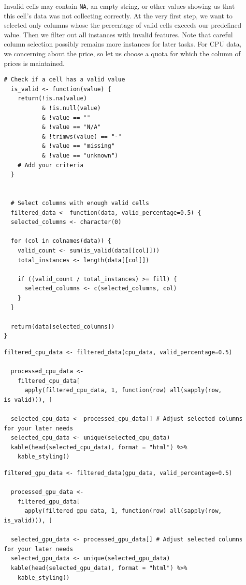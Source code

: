 Invalid cells may contain \texttt{NA}, an empty string, or other values showing us that this cell's data was not collecting correctly. At the very first step, we want to selected only columns whose the percentage of valid cells exceeds our predefined value. Then we filter out all instances with invalid features. Note that careful column selection possibly remains more instances for later tasks. For CPU data, we concerning about the price, so let us choose a quota for which the column of prices is maintained.

\begin{lstlisting}[caption={Cleaning functions}]
  # Check if a cell has a valid value
  is_valid <- function(value) {
    return(!is.na(value)
           & !is.null(value)
           & !value == ""
           & !value == "N/A"
           & !trimws(value) == "-"
           & !value == "missing"
           & !value == "unknown")
    # Add your criteria
  }
  
  
  # Select columns with enough valid cells
  filtered_data <- function(data, valid_percentage=0.5) {
  selected_columns <- character(0) 
  
  for (col in colnames(data)) { 
    valid_count <- sum(is_valid(data[[col]])) 
    total_instances <- length(data[[col]]) 
    
    if ((valid_count / total_instances) >= fill) {
      selected_columns <- c(selected_columns, col)
    }
  }
  
  return(data[selected_columns])
}
  \end{lstlisting}


\begin{lstlisting}[caption={Cleaned CPU data}]
  filtered_cpu_data <- filtered_data(cpu_data, valid_percentage=0.5)

  processed_cpu_data <- 
    filtered_cpu_data[
      apply(filtered_cpu_data, 1, function(row) all(sapply(row, is_valid))), ]
  
  selected_cpu_data <- processed_cpu_data[] # Adjust selected columns for your later needs
  selected_cpu_data <- unique(selected_cpu_data)
  kable(head(selected_cpu_data), format = "html") %>%
    kable_styling()
\end{lstlisting}

\begin{lstlisting}[caption={Cleaned GPU data}]
  filtered_gpu_data <- filtered_data(gpu_data, valid_percentage=0.5)

  processed_gpu_data <- 
    filtered_gpu_data[
      apply(filtered_gpu_data, 1, function(row) all(sapply(row, is_valid))), ]
  
  selected_gpu_data <- processed_gpu_data[] # Adjust selected columns for your later needs
  selected_gpu_data <- unique(selected_gpu_data)
  kable(head(selected_gpu_data), format = "html") %>%
    kable_styling()
\end{lstlisting}

